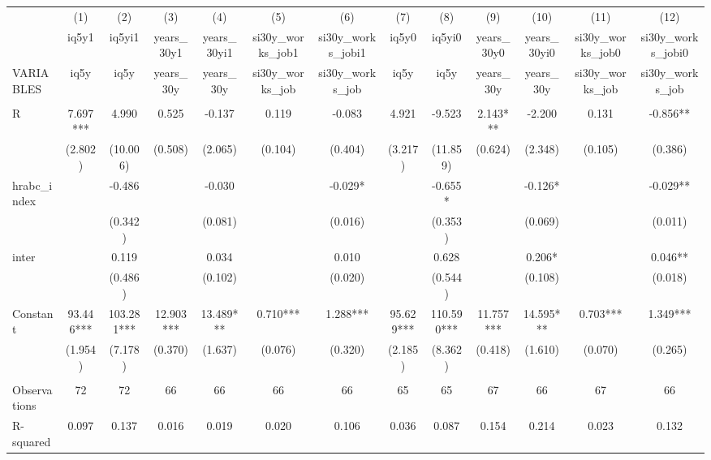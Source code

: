 \begin{tabular}{lcccccccccccc} \hline
 & (1) & (2) & (3) & (4) & (5) & (6) & (7) & (8) & (9) & (10) & (11) & (12) \\
 & iq5y1 & iq5yi1 & years\_30y1 & years\_30yi1 & si30y\_works\_job1 & si30y\_works\_jobi1 & iq5y0 & iq5yi0 & years\_30y0 & years\_30yi0 & si30y\_works\_job0 & si30y\_works\_jobi0 \\
VARIABLES & iq5y & iq5y & years\_30y & years\_30y & si30y\_works\_job & si30y\_works\_job & iq5y & iq5y & years\_30y & years\_30y & si30y\_works\_job & si30y\_works\_job \\ \hline
 &  &  &  &  &  &  &  &  &  &  &  &  \\
R & 7.697*** & 4.990 & 0.525 & -0.137 & 0.119 & -0.083 & 4.921 & -9.523 & 2.143*** & -2.200 & 0.131 & -0.856** \\
 & (2.802) & (10.006) & (0.508) & (2.065) & (0.104) & (0.404) & (3.217) & (11.859) & (0.624) & (2.348) & (0.105) & (0.386) \\
hrabc\_index &  & -0.486 &  & -0.030 &  & -0.029* &  & -0.655* &  & -0.126* &  & -0.029** \\
 &  & (0.342) &  & (0.081) &  & (0.016) &  & (0.353) &  & (0.069) &  & (0.011) \\
inter &  & 0.119 &  & 0.034 &  & 0.010 &  & 0.628 &  & 0.206* &  & 0.046** \\
 &  & (0.486) &  & (0.102) &  & (0.020) &  & (0.544) &  & (0.108) &  & (0.018) \\
Constant & 93.446*** & 103.281*** & 12.903*** & 13.489*** & 0.710*** & 1.288*** & 95.629*** & 110.590*** & 11.757*** & 14.595*** & 0.703*** & 1.349*** \\
 & (1.954) & (7.178) & (0.370) & (1.637) & (0.076) & (0.320) & (2.185) & (8.362) & (0.418) & (1.610) & (0.070) & (0.265) \\
 &  &  &  &  &  &  &  &  &  &  &  &  \\
Observations & 72 & 72 & 66 & 66 & 66 & 66 & 65 & 65 & 67 & 66 & 67 & 66 \\
 R-squared & 0.097 & 0.137 & 0.016 & 0.019 & 0.020 & 0.106 & 0.036 & 0.087 & 0.154 & 0.214 & 0.023 & 0.132 \\ \hline
\end{tabular}
